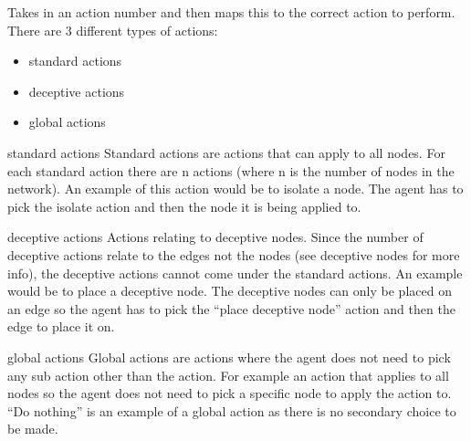 \documentclass[letterpaper,10pt,english]{sphinxmanual}
\begin{document}
\begin{fulllineitems}
\begin{fulllineitems}
\begin{quote}
\begin{description}
\end{description}\end{quote}

\end{fulllineitems}


\begin{fulllineitems}
\label{\detokenize{source/yawning_titan.envs.generic.core:yawning_titan.envs.generic.core.blue_interface.BlueInterface.perform_action}}
\sphinxAtStartPar
Takes in an action number and then maps this to the correct action to perform. There are 3 different types of
actions:
\begin{itemize}
\item {}
\sphinxAtStartPar
standard actions

\item {}
\sphinxAtStartPar
deceptive actions

\item {}
\sphinxAtStartPar
global actions

\end{itemize}

\sphinxAtStartPar
\textendash{}standard actions\textendash{}
Standard actions are actions that can apply to all nodes. For each standard action there are n actions (where n
is the number of nodes in the network). An example of this action would be to isolate a node. The agent has to
pick the isolate action and then the node it is being applied to.

\sphinxAtStartPar
\textendash{}deceptive actions\textendash{}
Actions relating to deceptive nodes. Since the number of deceptive actions relate to the edges not the nodes
(see deceptive nodes for more info), the deceptive actions cannot come under the standard actions. An example
would be to place a deceptive node. The deceptive nodes can only be placed on an edge so the agent has to pick
the “place deceptive node” action and then the edge to place it on.

\sphinxAtStartPar
\textendash{}global actions\textendash{}
Global actions are actions where the agent does not need to pick any sub action other than the action. For
example an action that applies to all nodes so the agent does not need to pick a specific node to apply the
action to. “Do nothing” is an example of a global action as there is no secondary choice to be made.


\end{fulllineitems}
\end{fulllineitems}
\end{document}
